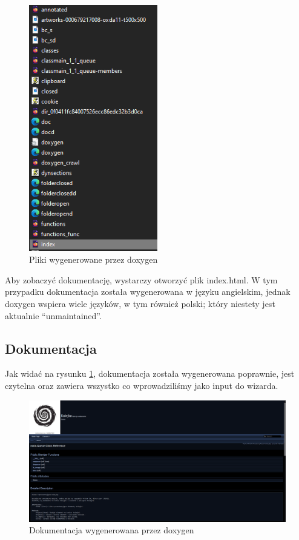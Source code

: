 \documentclass[a4paper,12pt]{article}
\begin{document}
\begin{figure}[ht]
    \centering
    \includegraphics[width=0.5\textwidth]{images/dox-pliki.png}
    \caption{Pliki wygenerowane przez doxygen}
\end{figure}

Aby zobaczyć dokumentację, wystarczy otworzyć plik index.html. W tym przypadku dokumentacja została wygenerowana w języku angielskim, jednak doxygen wspiera wiele języków, w tym również polski; który niestety jest aktualnie ``unmaintained''.

\newpage
\clearpage

\subsection{Dokumentacja}
Jak widać na rysunku \ref{fig:dox-1}, dokumentacja została wygenerowana poprawnie, jest czytelna oraz zawiera wszystko co wprowadziliśmy jako input do wizarda.
\begin{figure}[ht]
    \centering
    \includegraphics[width=1\textwidth]{images/dox-1.png}
    \caption{Dokumentacja wygenerowana przez doxygen}
    \label{fig:dox-1}
\end{figure}
\end{document}
